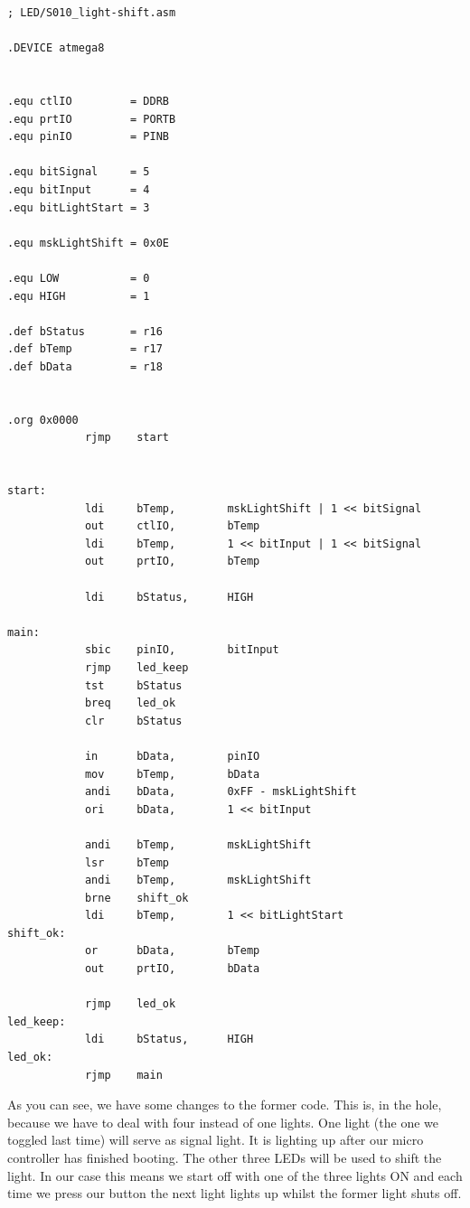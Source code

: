 \begin{lstlisting}
; LED/S010_light-shift.asm

.DEVICE atmega8


.equ ctlIO         = DDRB
.equ prtIO         = PORTB
.equ pinIO         = PINB

.equ bitSignal     = 5
.equ bitInput      = 4
.equ bitLightStart = 3

.equ mskLightShift = 0x0E

.equ LOW           = 0
.equ HIGH          = 1

.def bStatus       = r16
.def bTemp         = r17
.def bData         = r18


.org 0x0000
            rjmp    start


start:
            ldi     bTemp,        mskLightShift | 1 << bitSignal
            out     ctlIO,        bTemp
            ldi     bTemp,        1 << bitInput | 1 << bitSignal
            out     prtIO,        bTemp

            ldi     bStatus,      HIGH

main:
            sbic    pinIO,        bitInput
            rjmp    led_keep
            tst     bStatus
            breq    led_ok
            clr     bStatus

            in      bData,        pinIO
            mov     bTemp,        bData
            andi    bData,        0xFF - mskLightShift
            ori     bData,        1 << bitInput

            andi    bTemp,        mskLightShift
            lsr     bTemp
            andi    bTemp,        mskLightShift
            brne    shift_ok
            ldi     bTemp,        1 << bitLightStart
shift_ok:
            or      bData,        bTemp
            out     prtIO,        bData

            rjmp    led_ok
led_keep:
            ldi     bStatus,      HIGH
led_ok:
            rjmp    main
\end{lstlisting}

As you can see, we have some changes to the former code. This is, in the hole, because we have to deal with four instead of one lights. One light (the one we toggled last time) will serve as signal light. It is lighting up after our micro controller has finished booting. The other three LEDs will be used to shift the light. In our case this means we start off with one of the three lights ON and each time we press our button the next light lights up whilst the former light shuts off.

